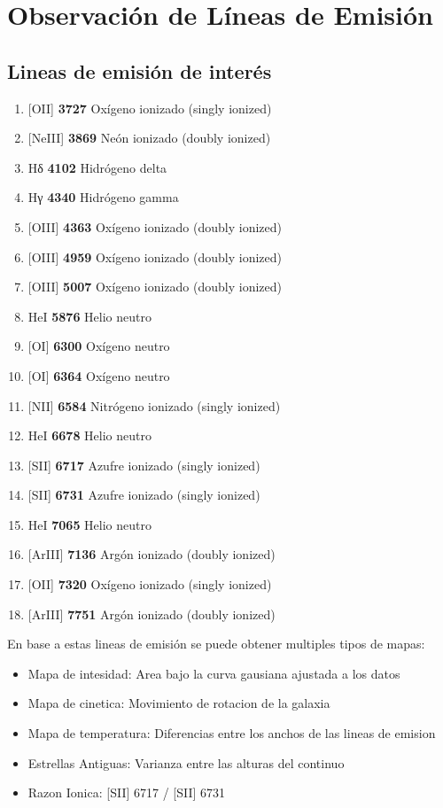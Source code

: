 \documentclass[9pt,twocolumn,a4paper]{opticajnl}
\begin{document}
\section*{Observación de Líneas de Emisión}
\subsection*{Lineas de emisión de interés}

\begin{enumerate}
  \item {[OII] \textbf{3727} Oxígeno ionizado (singly ionized)}
  \item {[NeIII] \textbf{3869} Neón ionizado (doubly ionized)}
  \item {Hδ \textbf{4102} Hidrógeno delta}
  \item {Hγ \textbf{4340} Hidrógeno gamma}
  \item {[OIII] \textbf{4363} Oxígeno ionizado (doubly ionized)}
  \item {[OIII] \textbf{4959} Oxígeno ionizado (doubly ionized)}
  \item {[OIII] \textbf{5007} Oxígeno ionizado (doubly ionized)}
  \item {HeI \textbf{5876} Helio neutro}
  \item {[OI] \textbf{6300} Oxígeno neutro}
  \item {[OI] \textbf{6364} Oxígeno neutro}
  \item {[NII] \textbf{6584} Nitrógeno ionizado (singly ionized)}
  \item {HeI \textbf{6678} Helio neutro}
  \item {[SII] \textbf{6717} Azufre ionizado (singly ionized)}
  \item {[SII] \textbf{6731} Azufre ionizado (singly ionized)}
  \item {HeI \textbf{7065} Helio neutro}
  \item {[ArIII] \textbf{7136} Argón ionizado (doubly ionized)}
  \item {[OII] \textbf{7320} Oxígeno ionizado (singly ionized)}
  \item {[ArIII] \textbf{7751} Argón ionizado (doubly ionized)}
\end{enumerate}

En base a estas lineas de emisión se puede obtener multiples tipos de mapas:
\begin{itemize}
  \item{Mapa de intesidad: Area bajo la curva gausiana ajustada a los datos        } 
  \item{Mapa de cinetica: Movimiento de rotacion de la galaxia                     } 
  \item{Mapa de temperatura: Diferencias entre los anchos de las lineas de emision } 
  \item{Estrellas Antiguas: Varianza entre las alturas del continuo                } 
  \item{Razon Ionica:  [SII] 6717 / [SII] 6731                                     } 
\end{itemize}
\end{document}
